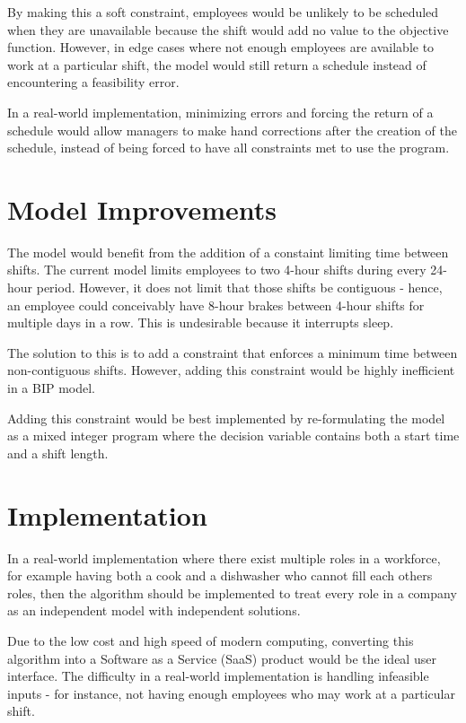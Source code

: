 By making this a soft constraint, employees would be unlikely to be scheduled when they are unavailable because the shift would add no value to the objective function. However, in edge cases where not enough employees are available to work at a particular shift, the model would still return a schedule instead of encountering a feasibility error. 

In a real-world implementation, minimizing errors and forcing the return of a schedule would allow managers to make hand corrections after the creation of the schedule, instead of being forced to have all constraints met to use the program. 

\section{Model Improvements}

The model would benefit from the addition of a constaint limiting time between shifts. The current model limits employees to two 4-hour shifts during every 24-hour period. However, it does not limit that those shifts be contiguous - hence, an employee could conceivably have 8-hour brakes between 4-hour shifts for multiple days in a row. This is undesirable because it interrupts sleep.

The solution to this is to add a constraint that enforces a minimum time between non-contiguous shifts. However, adding this constraint would be highly inefficient in a BIP model. 

Adding this constraint would be best implemented by re-formulating the model as a mixed integer program where the decision variable contains both a start time and a shift length. 

\section{Implementation}

In a real-world implementation where there exist multiple roles in a workforce, for example having both a cook and a dishwasher who cannot fill each others roles, then the algorithm should be implemented to treat every role in a company as an independent model with independent solutions. 

Due to the low cost and high speed of modern computing, converting this algorithm into a Software as a Service (SaaS) product would be the ideal user interface. The difficulty in a real-world implementation is handling infeasible inputs - for instance, not having enough employees who may work at a particular shift.

